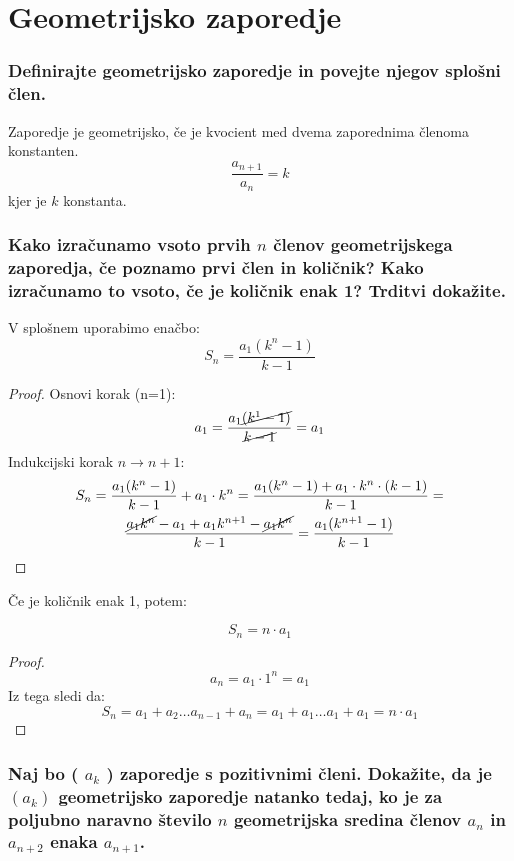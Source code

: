 \documentclass{article}
\begin{document}
\section{Geometrijsko zaporedje}
\subsubsection*{Definirajte geometrijsko zaporedje in povejte njegov splošni člen.}

Zaporedje je geometrijsko, če je kvocient med dvema zaporednima členoma konstanten.
$$
\frac{a_{n+1}}{a_n} = k
$$
kjer je $k$ konstanta.
\subsubsection*{Kako izračunamo vsoto prvih $n$ členov geometrijskega zaporedja, če poznamo prvi člen in količnik? Kako izračunamo to vsoto, če je količnik enak 1? Trditvi dokažite.}

V splošnem uporabimo enačbo:
$$
S_n = \frac{a_1(k^n - 1)}{k-1}
$$

\begin{proof}
    Osnovi korak (n=1):
    $$
        a_1 = \frac{a_1 \cancel{(k^1 - 1)}}{ \cancel{k-1}} = a_1
    $$
    Indukcijski korak $n \rightarrow n + 1$:
    \begin{gather*}
        S_n = \frac{a_1(k^n - 1)}{k-1} + a_1 \cdot k^n =
        \frac{a_1(k^n-1) + a_1 \cdot k^n \cdot (k-1)}{k-1} = \\
        \frac{\cancel{a_1 k^n} - a_1 + a_1 k^{n+1} - \cancel{a_1 k^n}}{k-1} =
        \frac{a_1(k^{n+1} - 1)}{k-1}
    \end{gather*}
\end{proof}


Če je količnik enak 1, potem:

$$
S_n = n\cdot a_1
$$

\begin{proof}
    $$
    a_n = a_1\cdot 1^n = a_1
    $$
    Iz tega sledi da:
    $$
    S_n = a_1 + a_2 \dots a_{n-1} + a_n = a_1 + a_1 \dots a_1 + a_1 = n \cdot a_1
    $$
\end{proof}
\subsubsection*{Naj bo ( $a_{k}$ ) zaporedje s pozitivnimi členi. Dokažite, da je $\left(a_{k}\right)$ geometrijsko zaporedje natanko tedaj, ko je za poljubno naravno število $n$ geometrijska sredina členov $a_{n}$ in $a_{n+2}$ enaka $a_{n+1}$.}
\end{document}
